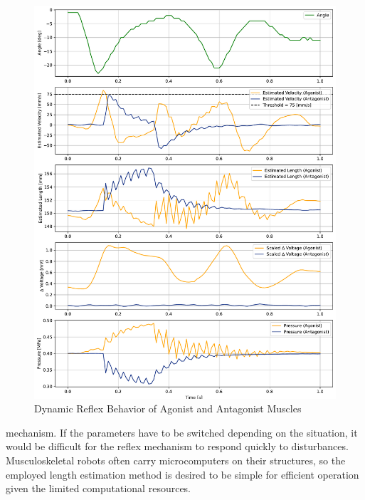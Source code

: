 \begin{figure}[t]
\begin{minipage}[H]{\textwidth}
\begin{minipage}[H]{0.48\textwidth}
            \includegraphics[width=\columnwidth]{fig/20240819_r20_reflex_all_plt.pdf}
            \caption{Dynamic Reflex Behavior of Agonist and Antagonist Muscles}
            \label{fig:reflex_all}
        \end{minipage}
    \end{minipage}
\end{figure}

\noindent mechanism. If the parameters have to be switched depending on the situation, it would be difficult for the reflex mechanism to respond quickly to disturbances.
Musculoskeletal robots often carry microcomputers on their structures, so the employed length estimation method is desired to be simple for efficient operation given the limited computational resources.



